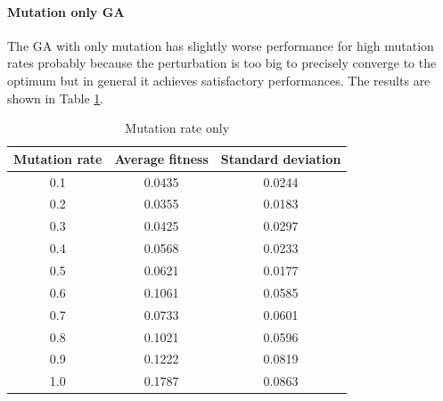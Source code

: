 \paragraph*{Mutation only GA}
The GA with only mutation has slightly worse performance for high mutation rates probably because the perturbation is too big to precisely converge to the optimum but in general it achieves satisfactory performances. The results are shown in Table \ref{tab:mutation_rate}.
\begin{table}[H]
    \centering
    \begin{tabular}{|c|c|c|}
        Mutation rate & Average fitness & Standard deviation \\ \hline
        0.1           & 0.0435          & 0.0244             \\
        0.2           & 0.0355          & 0.0183             \\
        0.3           & 0.0425          & 0.0297             \\
        0.4           & 0.0568          & 0.0233             \\
        0.5           & 0.0621          & 0.0177             \\
        0.6           & 0.1061          & 0.0585             \\
        0.7           & 0.0733          & 0.0601             \\
        0.8           & 0.1021          & 0.0596             \\
        0.9           & 0.1222          & 0.0819             \\
        1.0           & 0.1787          & 0.0863             \\
    \end{tabular}
    \caption{Mutation rate only}
    \label{tab:mutation_rate}
\end{table}

